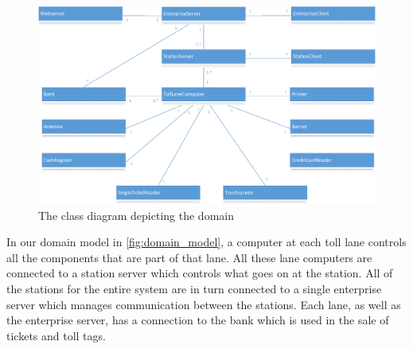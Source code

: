 \begin{figure}[H]
\centering
\includegraphics[width=1\textwidth]{img/domain_model/domain_model}
\caption{The class diagram depicting the domain}
\label{fig:domain_model}
\end{figure}

In our domain model in {\autoref{fig:domain_model}}, a computer at each toll lane controls all the components that are part of that lane. All these lane computers are connected to a station server which controls what goes on at the station. All of the stations for the entire system are in turn connected to a single enterprise server which manages communication between the stations. Each lane, as well as the enterprise server, has a connection to the bank which is used in the sale of tickets and toll tags.
